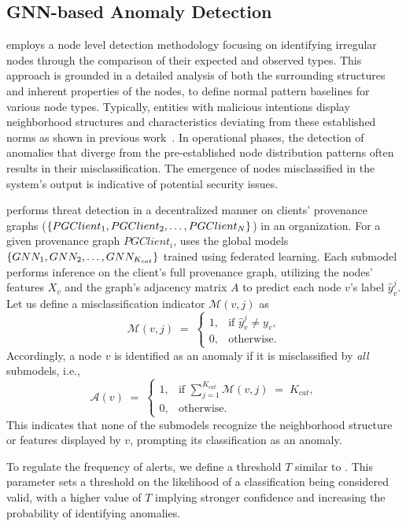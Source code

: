 \subsection{GNN-based Anomaly Detection}
\label{sys:anomaly_detection}

\Sys employs a node level detection methodology focusing on identifying irregular nodes through the comparison of their expected and observed types. This approach is grounded in a detailed analysis of both the surrounding structures and inherent properties of the nodes, to define normal pattern baselines for various node types. Typically, entities with malicious intentions display neighborhood structures and characteristics deviating from these established norms as shown in previous work~\cite{flash2024,cheng2023kairos,yangprographer}. In operational phases, the detection of anomalies that diverge from the pre-established node distribution patterns often results in their misclassification. The emergence of nodes misclassified in the system's output is indicative of potential security issues.

\Sys performs threat detection in a decentralized manner on clients' provenance graphs (\( \{PGClient_{1}, PGClient_{2}, \ldots, \\ PGClient_{N}\} \)) in an organization. For a given provenance graph \(PGClient_{i}\), \Sys uses the global \gnnshort models \(\{GNN_1, \\ GNN_2, \ldots, GNN_{K_{cat}}\}\) trained using federated learning. Each submodel performs inference on the client's full provenance graph, utilizing the nodes' features \(X_v\) and the graph's adjacency matrix \(A\) to predict each node \(v\)'s label \(\hat{y}_v^j\). Let us define a misclassification indicator \(\mathcal{M}(v, j)\) as
\[
\mathcal{M}(v, j) \;=\;
\begin{cases}
1, & \text{if } \hat{y}_v^j \neq y_v,\\
0, & \text{otherwise}.
\end{cases}
\]
Accordingly, a node \(v\) is identified as an anomaly if it is misclassified by \emph{all} submodels, i.e.,
\[
\mathcal{A}(v) \;=\;
\begin{cases}
1, & \text{if } \sum_{j=1}^{K_{cat}} \mathcal{M}(v, j) \;=\; K_{cat},\\
0, & \text{otherwise}.
\end{cases}
\]
This indicates that none of the submodels recognize the neighborhood structure or features displayed by \(v\), prompting its classification as an anomaly.


To regulate the frequency of alerts, we define a threshold \(T\) similar to \flash. This parameter sets a threshold on the likelihood of a classification being considered valid, with a higher value of \(T\) implying stronger confidence and increasing the probability of identifying anomalies.
